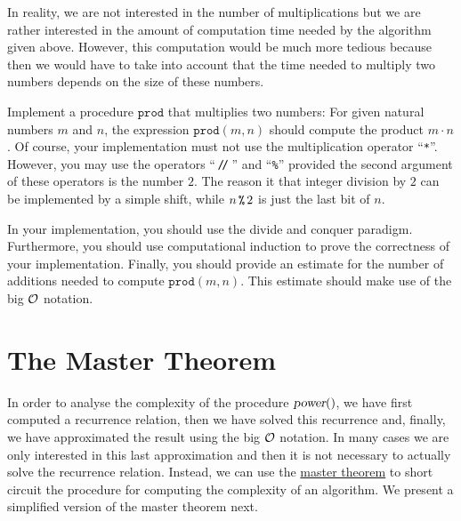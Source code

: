 \remark
In reality, we are not interested in the number of multiplications but we are rather interested
in the amount of computation time needed by the algorithm given above.
However, this computation would be much more tedious because then we would have to take into account
that the time needed to multiply two numbers depends on the size of these numbers.

\exercise
Implement a procedure $\mathtt{prod}$ that multiplies two numbers:
For given natural numbers $m$ and $n$, the expression $\mathtt{prod}(m, n)$  should compute the product
$m\cdot n$.  Of course, your implementation must not use the multiplication operator ``\texttt{*}''.
However, you may use the operators ``$\mbox{\,\texttt{/}$\!$\texttt{/}\,}$'' and ``\texttt{\%}'' provided
the second argument of these
operators is the number $2$.  The reason it that integer division by $2$ can be implemented by a simple
shift, while $n\, \texttt{\symbol{37}}\, 2$ is just the last bit of $n$.

In your implementation, you should use the
divide and conquer paradigm.  Furthermore, you should use computational induction to prove the
correctness of your implementation.  Finally, you should provide an estimate for the number of
additions needed to compute $\mathtt{prod}(m,n)$.  This estimate should make use of the big $\mathcal{O}$
notation. 
\eox


\section{The Master Theorem}
In order to analyse the complexity of  the procedure $\textsl{power}()$,
we have first computed a  recurrence relation, then we have solved this recurrence and, finally,  
we have approximated the result using the big $\mathcal{O}$ notation.  In many cases we are only interested in this
last approximation and then it is not necessary to actually solve the recurrence relation.  
Instead, we can use the 
\href{http://en.wikipedia.org/wiki/Master_theorem#Generic_form}{master theorem} to short
circuit the procedure for computing the complexity of an algorithm. 
We present a simplified version of the master theorem next.

